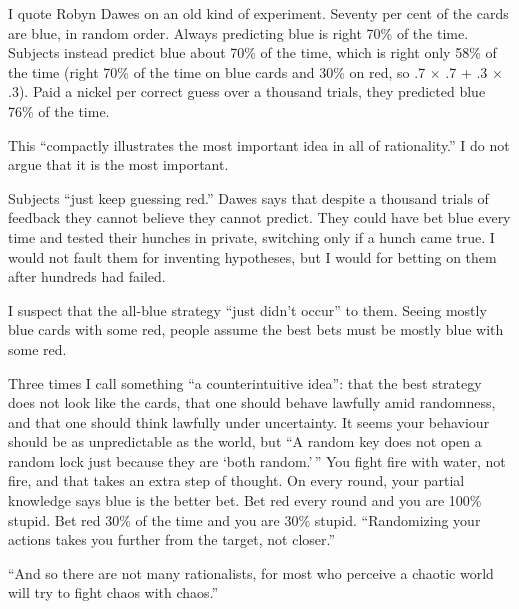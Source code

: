 
I quote Robyn Dawes on an old kind of experiment. Seventy per cent of the cards are blue, in random order. Always predicting blue is right 70\% of the time. Subjects instead predict blue about 70\% of the time, which is right only 58\% of the time (right 70\% of the time on blue cards and 30\% on red, so .7 × .7 + .3 × .3). Paid a nickel per correct guess over a thousand trials, they predicted blue 76\% of the time. 

This ``compactly illustrates the most important idea in all of rationality.'' I do not argue that it is the most important.

Subjects ``just keep guessing red.'' Dawes says that despite a thousand trials of feedback they cannot believe they cannot predict. They could have bet blue every time and tested their hunches in private, switching only if a hunch came true. I would not fault them for inventing hypotheses, but I would for betting on them after hundreds had failed.

I suspect that the all-blue strategy ``just didn't occur'' to them. Seeing mostly blue cards with some red, people assume the best bets must be mostly blue with some red. 

Three times I call something ``a counterintuitive idea'': that the best strategy does not look like the cards, that one should behave lawfully amid randomness, and that one should think lawfully under uncertainty. It seems your behaviour should be as unpredictable as the world, but ``A random key does not open a random lock just because they are `both random.'\,'' You fight fire with water, not fire, and that takes an extra step of thought. On every round, your partial knowledge says blue is the better bet. Bet red every round and you are 100\% stupid. Bet red 30\% of the time and you are 30\% stupid. ``Randomizing your actions takes you further from the target, not closer.'' 

``And so there are not many rationalists, for most who perceive a chaotic world will try to fight chaos with chaos.'' 

